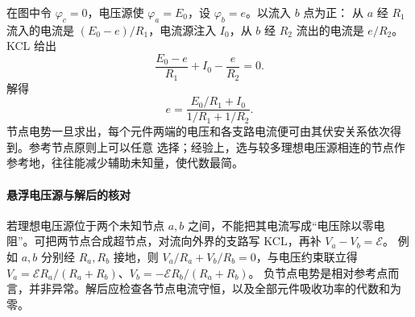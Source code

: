 \nodeMethodFigure
{}

在图中令 $\varphi_c=0$，电压源使 $\varphi_a=E_0$，设 $\varphi_b=e$。以流入 $b$ 点为正：
从 $a$ 经 $R_1$ 流入的电流是 $(E_0-e)/R_1$，电流源注入 $I_0$，从 $b$ 经 $R_2$ 流出的电流是
$e/R_2$。KCL 给出
\[
  \frac{E_0-e}{R_1}+I_0-\frac e{R_2}=0.
\]
解得
\[
  \boxed{e=\frac{E_0/R_1+I_0}{1/R_1+1/R_2}}.
\]
节点电势一旦求出，每个元件两端的电压和各支路电流便可由其伏安关系依次得到。参考节点原则上可以任意
选择；经验上，选与较多理想电压源相连的节点作参考地，往往能减少辅助未知量，使代数最简。

\paragraph{悬浮电压源与解后的核对}
若理想电压源位于两个未知节点 $a,b$ 之间，不能把其电流写成“电压除以零电阻”。可把两节点合成超节点，对流向外界的支路写 KCL，再补 $V_a-V_b=\mathcal E$。
例如 $a,b$ 分别经 $R_a,R_b$ 接地，则
$V_a/R_a+V_b/R_b=0$，与电压约束联立得
$V_a=\mathcal E R_a/(R_a+R_b)$、$V_b=-\mathcal E R_b/(R_a+R_b)$。
负节点电势是相对参考点而言，并非异常。解后应检查各节点电流守恒，以及全部元件吸收功率的代数和为零。

